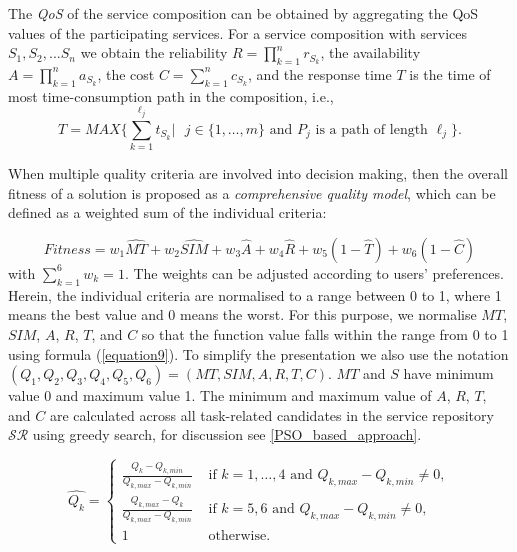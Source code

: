 \documentclass{llncs}
\begin{document}
The \emph{QoS} of the service composition can be obtained by aggregating the QoS values of the participating services. For a service composition with services $ S_1, S_2, ... S_n$ we obtain the reliability $R=\prod\limits^n_{k=1}r_{S_k}$, the availability $A=\prod\limits^n_{k=1}a_{S_k}$, the cost $C=\sum\limits^n_{k=1}c_{S_k}$, and the response time $T$ is the time of most time-consumption path in the composition, i.e., $$T = MAX \{\sum\limits^{\ell_j}_{k=1}t_{S_k} | \text{ $j\in\{1,\ldots,m\}$ and $P_j$ is a path of length $\ell_j$}\}.$$


\noindent When multiple quality criteria are involved into decision making, then the overall fitness of a solution is proposed as a \emph{comprehensive quality model}, which can be defined as a weighted sum of the individual criteria: 

\begin{equation}
\label{equation8}
Fitness = w_1 \hat{MT} + w_2 \hat{SIM} + w_3 \hat{A} + w_4 \hat{R} + w_5(1 - \hat{T}) + w_6(1 - \hat{C})
\end{equation}
\noindent with $\sum_{k=1}^{6} w_k= 1$. The weights can be adjusted according to users' preferences. Herein, the individual criteria are normalised to a range between 0 to 1, where 1 means the best value and 0 means the worst. For this purpose, we normalise $MT$, $SIM$, $A$, $R$, $T$, and $C$ so that the function value falls within the range from 0 to 1 using formula (\ref{equation9}). To simplify the presentation we also use the notation $(Q_1,Q_2,Q_3,Q_4,Q_5,Q_6) = (MT,SIM,A,R,T,C)$. $MT$ and $S$ have minimum value 0 and maximum value 1. The minimum and maximum value of $A$, $R$, $T$, and $C$ are calculated across all task-related candidates in the service repository $\mathcal{SR}$ using greedy search, for discussion see \ref{PSO_based_approach}.

\begin{equation}
\label{equation9}
\hat{Q_k} = 
\begin{cases}
	\frac{Q_k - Q_{k, min}}{Q_{k, max} - Q_{k, min}} & \text{ if $k=1,\ldots,4$ and }Q_{k, max} - Q_{k, min} \neq 0,\\
	\frac{Q_{k,max} - Q_k}{Q_{k, max} - Q_{k, min}} & \text{ if $k=5,6$ and }Q_{k, max} - Q_{k, min} \neq 0,\\
	1 & \text{ otherwise}.
\end{cases}
\end{equation}
\end{document}
